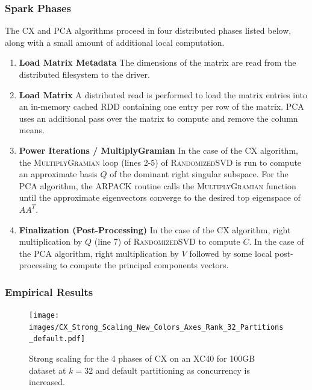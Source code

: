   \subsubsection{Spark Phases}
  The CX and PCA algorithms proceed in four distributed phases listed below, along with a small amount of additional local computation.
  \begin{enumerate}
      \item \textbf{Load Matrix Metadata}
         The dimensions of the matrix are read from the distributed filesystem to the driver.
      \item \textbf{Load Matrix}
         A distributed read is performed to load the matrix entries into an in-memory cached
         RDD containing one entry per row of the matrix. PCA uses an additional pass over the matrix to compute and remove the column means.
       \item \textbf{Power Iterations / MultiplyGramian}
         In the case of the CX algorithm, the \textsc{MultiplyGramian} loop (lines 2-5) of
         \textsc{RandomizedSVD} is run to compute an approximate basis $Q$
         of the dominant right singular subspace. For the PCA algorithm, the ARPACK routine calls the \textsc{MultiplyGramian} function
         until the approximate eigenvectors converge to the desired top eigenspace of $AA^T.$
       \item \textbf{Finalization (Post-Processing)}
         In the case of the CX algorithm, right multiplication by $Q$ (line 7) of \textsc{RandomizedSVD} to compute $C$. In the case of the PCA algorithm,
         right multiplication by $V$ followed by some local post-processing to compute the principal components vectors.
  \end{enumerate}

  \subsubsection{Empirical Results}

    \begin{figure} [h!btp]
    \begin{centering}
    \texttt{[image: images/CX\_Strong\_Scaling\_New\_Colors\_Axes\_Rank\_32\_Partitions\_default.pdf]}
    \end{centering}
    \caption{ Strong scaling for the 4 phases of CX on an XC40 for 100GB dataset at $k=32$ and default partitioning as concurrency is increased.} 
    \label{fig:xc40scaling}
    \end{figure} 

